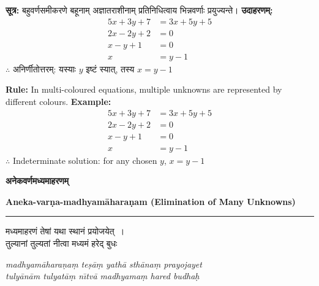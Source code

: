 \documentclass[11pt,a4paper]{article}
\newcommand{\dev}[1]{{\devanagarifont #1}}
\newcommand{\bicol}[2]{%
\noindent%
\begin{minipage}[t]{0.48\textwidth}
\begin{flushleft}
\small
#1
\end{flushleft}
\end{minipage}%
\hfill%
\begin{minipage}[t]{0.48\textwidth}
\begin{flushleft}
\small
#2
\end{flushleft}
\end{minipage}%
\vspace{0.4em}
}
\newcommand{\bicolverse}[2]{%
\par\noindent%
\begin{minipage}[t]{0.48\textwidth}
\centering
\color{versecolor}
\devanagarifont
\small
#1
\end{minipage}%
\hfill%
\begin{minipage}[t]{0.48\textwidth}
\centering
\color{versecolor}
\small
#2
\end{minipage}%
\par\vspace{0.4em}
}
\newcommand{\sectionbicol}[2]{%
\vspace{0.5em}
\noindent%
\begin{minipage}[t]{0.48\textwidth}
\begin{center}
\large\bfseries\color{sectioncolor}
\dev{#1}
\end{center}
\end{minipage}%
\hfill%
\begin{minipage}[t]{0.48\textwidth}
\begin{center}
\large\bfseries\color{sectioncolor}
#2
\end{center}
\end{minipage}%
\vspace{0.3em}
\noindent\rule{\textwidth}{0.4pt}
}
\begin{document}
\bicol{%
\textbf{सूत्र:} बहुवर्णसमीकरणे बहूनाम् अज्ञातराशीनाम् प्रतिनिधित्वाय भिन्नवर्णाः प्रयुज्यन्ते।
\vspace{0.3cm}
\textbf{उदाहरणम्:}
\begin{align*}
5x + 3y + 7 &= 3x + 5y + 5 \\
2x - 2y + 2 &= 0 \\
x - y + 1 &= 0 \\
x &= y - 1
\end{align*}
$\therefore$ अनिर्णीतोत्तरम्: यस्याः $y$ इष्टं स्यात्, तस्य $x = y - 1$
}{%
\textbf{Rule:} In multi-coloured equations, multiple unknowns are represented by different colours.
\vspace{0.3cm}
\textbf{Example:}
\begin{align*}
5x + 3y + 7 &= 3x + 5y + 5 \\
2x - 2y + 2 &= 0 \\
x - y + 1 &= 0 \\
x &= y - 1
\end{align*}
$\therefore$ Indeterminate solution: for any chosen $y$, $x = y - 1$
}

\clearpage

\sectionbicol{अनेकवर्णमध्यमाहरणम्}{Aneka-var\d{n}a-madhyam\={a}hara\d{n}am (Elimination of Many Unknowns)}

\vspace{0.3cm}

\bicolverse{%
मध्यमाहरणं तेषां यथा स्थानं प्रयोजयेत्~।\\
तुल्यानां तुल्यतां नीत्वा मध्यमं हरेद् बुधः~
}{%
\textit{madhyam\={a}hara\d{n}a\d{m} te\d{s}\={a}\d{m} yath\={a} sth\={a}na\d{m} prayojayet}\\
\textit{tuly\={a}n\={a}m tulyat\={a}\d{m} n\={\i}tv\={a} madhyama\d{m} hared budha\d{h}}
}

\vspace{0.5cm}
\end{document}
